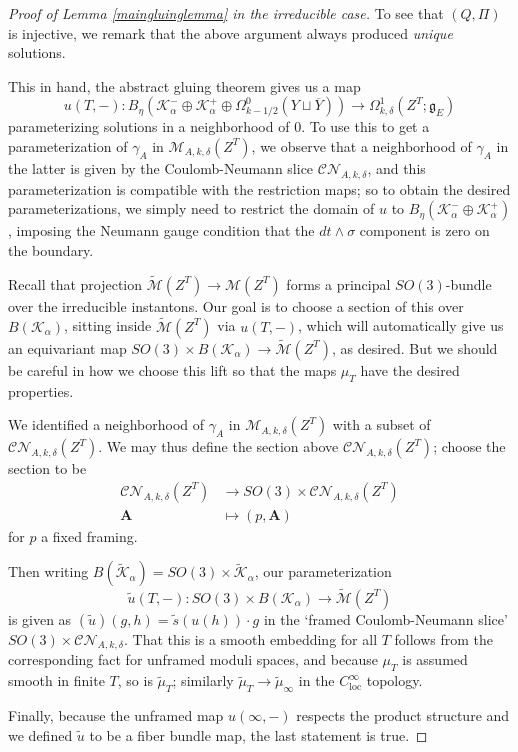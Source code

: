 \documentclass[10pt,a4paper]{amsart}
\theoremstyle{definition}
\theoremstyle{remark}
\numberwithin{figure}{qchap}
\begin{document}
\begin{proof}[Proof of Lemma \ref{maingluinglemma} in the irreducible case]
To see that $(Q, \Pi)$ is injective, we remark that the above argument always produced \emph{unique} solutions.

This in hand, the abstract gluing theorem gives us a map $$u(T, -): B_\eta\left(\mathcal K^-_\alpha \oplus \mathcal K^+_\alpha \oplus \Omega^0_{k-1/2}(Y \sqcup \overline Y)\right) \to \Omega^1_{k,\delta}(Z^T;\mathfrak g_E)$$ parameterizing solutions in a neighborhood of $0$. To use this to get a parameterization of $\gamma_A$ in $\mathcal M_{A,k,\delta}(Z^T)$, we observe that a neighborhood of $\gamma_A$ in the latter is given by the Coulomb-Neumann slice $\mathcal{CN}_{A,k,\delta}$, and this parameterization is compatible with the restriction maps; so to obtain the desired parameterizations, we simply need to restrict the domain of $u$ to $B_\eta(\mathcal K^-_\alpha \oplus \mathcal K^+_\alpha)$, imposing the Neumann gauge condition that the $dt \wedge \sigma$ component is zero on the boundary.

Recall that projection $\widetilde{\mathcal M}(Z^T) \to \mathcal M(Z^T)$ forms a principal $SO(3)$-bundle over the irreducible instantons. Our goal is to choose a section of this over $B(\mathcal K_\alpha)$, sitting inside $\widetilde{\mathcal M}(Z^T)$ via $u(T, -)$, which will automatically give us an equivariant map $SO(3) \times B(\mathcal K_\alpha) \to \widetilde{\mathcal M}(Z^T)$, as desired. But we should be careful in how we choose this lift so that the maps $\mu_T$ have the desired properties.

We identified a neighborhood of $\gamma_A$ in $\mathcal M_{A,k,\delta}(Z^T)$ with a subset of $\mathcal{CN}_{A,k,\delta}(Z^T)$. We may thus define the section above $\mathcal{CN}_{A,k,\delta}(Z^T)$; choose the section to be 
\begin{align*}\mathcal{CN}_{A,k,\delta}(Z^T) &\to SO(3) \times \mathcal{CN}_{A,k,\delta}(Z^T) \\
\mathbf{A} &\mapsto (p, \mathbf{A})
\end{align*}
for $p$ a fixed framing.

Then writing $B(\widetilde{\mathcal K}_\alpha) = SO(3) \times \widetilde{\mathcal K}_\alpha$, our parameterization $$\widetilde u(T,-): SO(3) \times B(\mathcal K_\alpha) \to \widetilde{\mathcal M}(Z^T)$$ is given as $(\tilde u)(g,h) = \tilde s(u(h)) \cdot g$ in the `framed Coulomb-Neumann slice' $SO(3) \times \mathcal{CN}_{A,k,\delta}$. That this is a smooth embedding for all $T$ follows from the corresponding fact for unframed moduli spaces, and because $\mu_T$ is assumed smooth in finite $T$, so is $\widetilde\mu_T$; similarly $\widetilde{\mu}_T \to \widetilde{\mu}_\infty$ in the $C^\infty_{\text{loc}}$ topology.

Finally, because the unframed map $u(\infty, -)$ respects the product structure and we defined $\tilde u$ to be a fiber bundle map, the last statement is true.
\end{proof}
\end{document}
